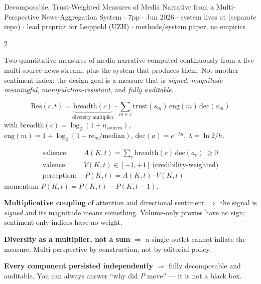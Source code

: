 \documentclass[10pt,a4paper]{article}
\begin{document}
\small

{Decomposable, Trust-Weighted Measures of Media Narrative from a Multi-Perspective News-Aggregation System}
{ $\cdot$ 7pp $\cdot$ Jun 2026 $\cdot$ system lives at 
 (separate repo) $\cdot$ lead preprint for Leippold (UZH) $\cdot$ methods/system paper, no empirics}

\begin{multicols}{2}

Two quantitative measures of media narrative computed continuously from a live multi-source news stream,
plus the system that produces them. Not another sentiment index: the design goal is a measure that is
\emph{signed}, \emph{magnitude-meaningful}, \emph{manipulation-resistant}, and \emph{fully auditable}.

\[
  \mathrm{Res}(c,t)=\underbrace{\mathrm{breadth}(c)}_{\text{diversity multiplier}}\cdot
   \sum_{m\in c}\mathrm{trust}(s_m)\,\mathrm{eng}(m)\,\mathrm{dec}(a_m)
\]
with
$\mathrm{breadth}(c)=\log_2(1+n_{\text{sources}})$,
$\mathrm{eng}(m)=1+\log_2(1+\mathrm{re}_m/\text{median})$,
$\mathrm{dec}(a)=e^{-\lambda a}$, $\lambda=\ln2/h$.

\begin{align*}
 \text{salience:}\ & A(K,t)=\textstyle\sum_c \mathrm{breadth}(c)\,\mathrm{dec}(a_c)\ \ge 0\\
 \text{valence:}\ & V(K,t)\in[-1,+1]\ \text{(credibility-weighted)}\\
 \text{perception:}\ & \boxed{\,P(K,t)=A(K,t)\cdot V(K,t)\,}
\end{align*}
momentum $\dot P(K,t)=P(K,t)-P(K,t-1)$.

\begin{opnums}
\item \textbf{Multiplicative coupling} of attention and directional sentiment $\Rightarrow$ the signal is
      \emph{signed} and its magnitude means something. Volume-only proxies have no sign; sentiment-only
      indices have no weight.
\item \textbf{Diversity as a multiplier, not a sum} $\Rightarrow$ a single outlet cannot inflate the
      measure. Multi-perspective by construction, not by editorial policy.
\item \textbf{Every component persisted independently} $\Rightarrow$ fully decomposable and auditable.
      You can always answer ``why did $P$ move'' — it is not a black box.
\end{opnums}


\end{multicols}
\end{document}
